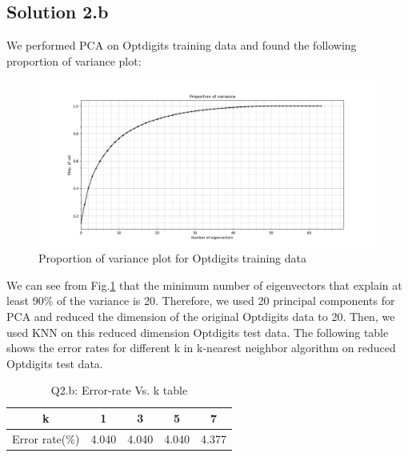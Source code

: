 \subsection*{Solution 2.b}
We performed PCA on Optdigits training data and found the following proportion of variance plot:
\begin{figure}[h!]
	\centering
	\includegraphics[scale=0.5]{pov_2b}
	\caption{Proportion of variance plot for Optdigits training data}
	\label{fig:pov_2b}
\end{figure}
\newline
We can see from Fig.\ref{fig:pov_2b} that the minimum number of eigenvectors that explain at least 90\% of the variance is 20.
\newline
Therefore, we used 20 principal components for PCA and reduced the dimension of the original Optdigits data to 20. Then, we used KNN on this reduced dimension Optdigits test data. The following table shows the error rates for different k in k-nearest neighbor algorithm on reduced Optdigits test data.
\begin{table}[h!]
	\begin{center}
		\begin{tabular}{||c | c | c | c | c ||} 
			\hline
			k & 1 & 3 & 5 & 7 \\ [0.5ex] 
			\hline\hline
			Error rate(\%) & 4.040 & 4.040 & 4.040 & 4.377 \\ [1ex]
			\hline
		\end{tabular}
	\end{center}
	\caption{Q2.b: Error-rate Vs. k table}
\end{table}
